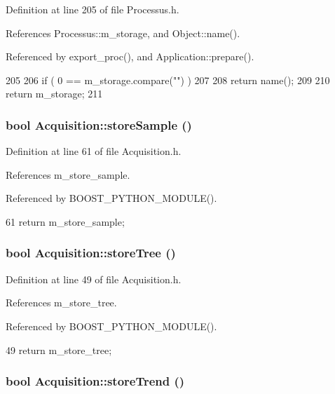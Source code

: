 Definition at line 205 of file Processus.h.

References Processus::m\_\-storage, and Object::name().

Referenced by export\_\-proc(), and Application::prepare().


\begin{DoxyCode}
205                        {
206     if ( 0 == m_storage.compare("") )
207     {
208       return name();
209     }
210     return m_storage;
211   }
\end{DoxyCode}
\hypertarget{classAcquisition_a9af304e0fb2076cd4f92703708efe83e}{
\subsubsection[{storeSample}]{\setlength{\rightskip}{0pt plus 5cm}bool Acquisition::storeSample ()}}
\label{classAcquisition_a9af304e0fb2076cd4f92703708efe83e}


Definition at line 61 of file Acquisition.h.

References m\_\-store\_\-sample.

Referenced by BOOST\_\-PYTHON\_\-MODULE().


\begin{DoxyCode}
61 {return m_store_sample;}
\end{DoxyCode}
\hypertarget{classAcquisition_a8ab7e58ccb3fee54eb6850e5081fae10}{
\subsubsection[{storeTree}]{\setlength{\rightskip}{0pt plus 5cm}bool Acquisition::storeTree ()}}
\label{classAcquisition_a8ab7e58ccb3fee54eb6850e5081fae10}


Definition at line 49 of file Acquisition.h.

References m\_\-store\_\-tree.

Referenced by BOOST\_\-PYTHON\_\-MODULE().


\begin{DoxyCode}
49 {return m_store_tree;}
\end{DoxyCode}
\hypertarget{classAcquisition_a5af693448daef6e9e054ab7f1aa50784}{
\subsubsection[{storeTrend}]{\setlength{\rightskip}{0pt plus 5cm}bool Acquisition::storeTrend ()}}
\label{classAcquisition_a5af693448daef6e9e054ab7f1aa50784}


